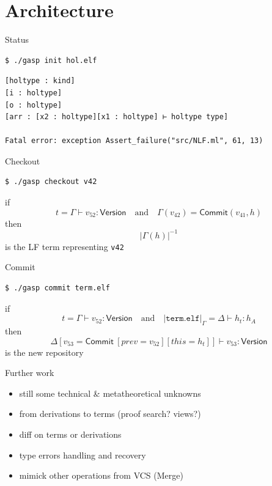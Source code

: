 \documentclass[ignorenonframetext,red]{beamer}
\newcommand\app[1]{{#1}\ }
\newcommand\eent[1]{\left[{#1}\right]}
\newcommand\econs[2]{{#1}\eent{#2}}
\newcommand\esing[1]{\econs{}{#1}}
\begin{document}
\section{Architecture}

\begin{frame}[fragile]{Status}
\small
\begin{verbatim}
$ ./gasp init hol.elf
\end{verbatim}
\pause
\begin{verbatim}
[holtype : kind]
[i : holtype]
[o : holtype]
[arr : [x2 : holtype][x1 : holtype] ⊢ holtype type]

Fatal error: exception Assert_failure("src/NLF.ml", 61, 13)
\end{verbatim}
\end{frame}

\begin{frame}[fragile]{Checkout}
\small
\begin{verbatim}
$ ./gasp checkout v42
\end{verbatim}
\normalsize
if
\[t = \Gamma\vdash v_{52} : \mathsf{Version} \quad\text{and}\quad
\Gamma(v_{42}) = \mathsf{Commit}(v_{41},h) \]
then 
\[ |\Gamma(h)|^{-1} \]
is the LF term representing \texttt{v42}
\end{frame}

\begin{frame}[fragile]{Commit}
  \small
\begin{verbatim}
$ ./gasp commit term.elf
\end{verbatim}
\normalsize
if
\[ t = \Gamma\vdash v_{52} : \mathsf{Version} \quad\text{and}\quad
|\mathtt{term.elf}|_\Gamma = \Delta\vdash h_t:h_A \]
then 
\[ \econs\Delta{v_{53} = \app{\mathsf{Commit}} \econs{\esing{prev =
      v_{52}}}{this = h_t}}\vdash v_{53} : \mathsf{Version}\] is the
new repository
\end{frame}

\begin{frame}{Further work}
  \begin{itemize}
  \item still some technical \& metatheoretical unknowns
  \item from derivations to terms (proof search? views?)
  \item \textsf{diff} on terms or derivations
  \item type errors handling and recovery
  \item mimick other operations from VCS (\textsf{Merge})
  \end{itemize}
\end{frame}
\end{document}
